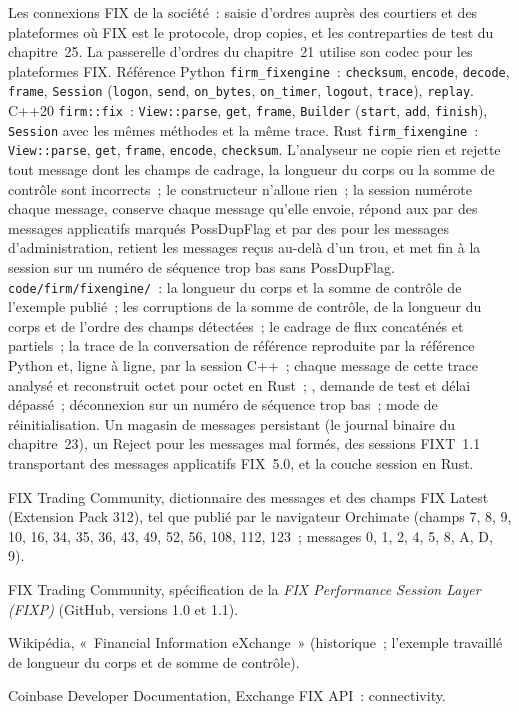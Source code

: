 \begin{build}
 Les connexions FIX de la société~: saisie d'ordres auprès des courtiers et des plateformes où FIX est le protocole, drop copies, et les
contreparties de test du chapitre~25. La passerelle d'ordres du chapitre~21 utilise son codec pour les plateformes FIX.
 Référence Python \texttt{firm\_fixengine}~: \texttt{checksum}, \texttt{encode}, \texttt{decode},
\texttt{frame}, \texttt{Session} (\texttt{logon}, \texttt{send}, \texttt{on\_bytes}, \texttt{on\_timer}, \texttt{logout},
\texttt{trace}), \texttt{replay}. C++20 \texttt{firm::fix}~: \texttt{View::parse}, \texttt{get}, \texttt{frame},
\texttt{Builder} (\texttt{start}, \texttt{add}, \texttt{finish}), \texttt{Session} avec les mêmes méthodes et la même trace. Rust
\texttt{firm\_fixengine}~: \texttt{View::parse}, \texttt{get}, \texttt{frame}, \texttt{encode}, \texttt{checksum}.
 L'analyseur ne copie rien et rejette tout message dont les champs de cadrage, la longueur du corps ou la somme de contrôle sont incorrects~; le
constructeur n'alloue rien~; la session numérote chaque message, conserve chaque message qu'elle envoie, répond aux  par
des messages applicatifs marqués PossDupFlag et par des  pour les messages d'administration, retient les messages reçus au-delà d'un trou, et
met fin à la session sur un numéro de séquence trop bas sans PossDupFlag.
 \texttt{code/firm/fixengine/}~: la longueur du corps et la somme de contrôle de l'exemple publié~; les corruptions de la somme de contrôle,
de la longueur du corps et de l'ordre des champs détectées~; le cadrage de flux concaténés et partiels~; la trace de la conversation de référence
reproduite par la référence Python et, ligne à ligne, par la session C++~; chaque message de cette trace analysé et reconstruit
octet pour octet en Rust~; , demande de test et délai dépassé~; déconnexion sur un numéro de séquence trop bas~; mode de réinitialisation.
 Un magasin de messages persistant (le journal binaire du chapitre~23), un Reject pour les messages mal formés, des sessions FIXT~1.1
transportant des messages applicatifs FIX~5.0, et la couche session en Rust.
\end{build}

\begin{omsources}
\item FIX Trading Community, dictionnaire des messages et des champs FIX Latest (Extension Pack 312), tel que publié par le
navigateur Orchimate (champs 7, 8, 9, 10, 16, 34, 35, 36, 43, 49, 52, 56, 108, 112, 123~; messages 0, 1, 2, 4, 5, 8, A, D, 9).
\item FIX Trading Community, spécification de la \emph{FIX Performance Session Layer (FIXP)} (GitHub, versions 1.0 et 1.1).
\item Wikipédia, «~Financial Information eXchange~» (historique~; l'exemple travaillé de longueur du corps et de somme de contrôle).
\item Coinbase Developer Documentation, Exchange FIX API~: connectivity.
\end{omsources}


